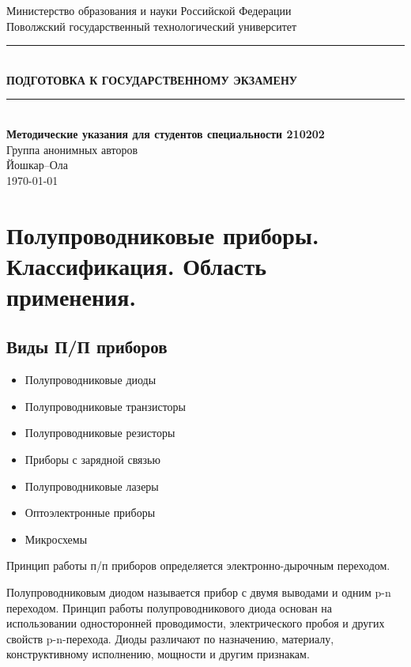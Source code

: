 \documentclass[unicode, 12pt, a4paper, oneside]{article}
\begin{document}
\begin{titlepage}
	\begin{center}
		{\Large Министерство образования и науки Российской Федерации}\\[0.3cm]
		{\Large Поволжский государственный технологический университет}\\[4cm]
		\noindent\rule{\textwidth}{0.5mm}\\[0.5cm]
		{\LARGE\bfseries ПОДГОТОВКА К ГОСУДАРСТВЕННОМУ ЭКЗАМЕНУ}\\[0.2cm]
		\noindent\rule{\textwidth}{0.5mm}\\[2cm]
		{\large\bfseries Методические указания для студентов специальности 210202}\\[3cm]
		\vfill
		{\large Группа анонимных авторов\\[0.2cm] Йошкар--Ола\\[0.1cm] \today}
	\end{center}
\end{titlepage}

\section{Полупроводниковые приборы. Классификация. Область применения.}

\subsection*{Виды П/П приборов}

\begin{itemize}
\item Полупроводниковые диоды
\item Полупроводниковые транзисторы
\item Полупроводниковые резисторы
\item Приборы с зарядной связью
\item Полупроводниковые лазеры
\item Оптоэлектронные приборы
\item Микросхемы
\end{itemize}

Принцип работы п/п приборов определяется электронно-дырочным переходом.

Полупроводниковым диодом называется прибор с двумя выводами и одним p-n переходом. Принцип работы полупроводникового диода основан на использовании односторонней проводимости, электрического пробоя и других свойств p-n-перехода. Диоды различают по назначению, материалу, конструктивному исполнению, мощности и другим признакам.
\end{document}
